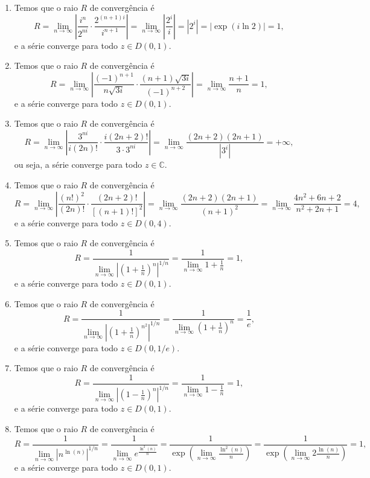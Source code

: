 \documentclass[12pt,a4paper]{article}
\begin{document}
\begin{enumerate}
\begin{enumerate}
			\item Temos que o raio $R$ de convergência é
			$$
			R = \lim\limits_{n\to\infty}\left| \frac{i^n}{2^{ni}}\cdot\frac{2^{(n+1)i}}{i^{n+1}} \right| = \lim\limits_{n\to\infty}\left| \frac{2^i}{i} \right| = |2^i| = |\exp(i\ln2)| = 1,
			$$
			e a série converge para todo $z\in D(0,1)$.
			
			\item Temos que o raio $R$ de convergência é
			$$
			R = \lim\limits_{n\to\infty} \left| \frac{(-1)^{n+1}}{n\sqrt{3i}}\cdot\frac{(n+1)\sqrt{3i}}{(-1)^{n+2}} \right| = \lim\limits_{n\to\infty}\frac{n+1}{n} = 1,
			$$
			e a série converge para todo $z\in D(0,1)$.
			
			\item Temos que o raio $R$ de convergência é
			$$
			R = \lim\limits_{n\to\infty}\left| \frac{3^{ni}}{i(2n)!}\cdot\frac{i(2n+2)!}{3\cdot 3^{ni}} \right| = \lim\limits_{n\to\infty} \frac{(2n+2)(2n+1)}{|3^i|} = +\infty, 
			$$
			ou seja, a série converge para todo $z\in\mathbb{C}$.
			
			\item Temos que o raio $R$ de convergência é 
			$$
			R = \lim\limits_{n\to\infty}\left| \frac{(n!)^2}{(2n)!}\cdot\frac{(2n+2)!}{[(n+1)!]^2} \right| = \lim\limits_{n\to\infty}\frac{(2n+2)(2n+1)}{(n+1)^2} = \lim\limits_{n\to\infty} \frac{4n^2+6n+2}{n^2+2n+1} = 4,
			$$
			e a série converge para todo $z\in D(0,4)$.
			
			\item Temos que o raio $R$ de convergência é
			$$
			R = \frac{1}{\lim\limits_{n\to\infty} \left| \left( 1+\frac{1}{n} \right)^n \right|^{1/n} } = \frac{1}{\lim\limits_{n\to\infty} 1 + \frac{1}{n}} = 1,
			$$
			e a série converge para todo $z\in D(0,1)$.
			
			\item Temos que o raio $R$ de convergência é
			$$
			R = \frac{1}{\lim\limits_{n\to\infty} \left| \left( 1+\frac{1}{n} \right)^{n^2} \right|^{1/n} } = \frac{1}{\lim\limits_{n\to\infty} \left(1 + \frac{1}{n}\right)^n} = \frac{1}{e},
			$$
			e a série converge para todo $z\in D(0,1/e)$.
			
			\item Temos que o raio $R$ de convergência é
			$$
			R = \frac{1}{\lim\limits_{n\to\infty} \left| \left( 1-\frac{1}{n} \right)^n \right|^{1/n} } = \frac{1}{\lim\limits_{n\to\infty} 1 - \frac{1}{n}} = 1,
			$$
			e a série converge para todo $z\in D(0,1)$.
			
			\item Temos que o raio $R$ de convergência é
			$$
			R = \frac{1}{\lim\limits_{n\to\infty}\left| n^{\ln(n)} \right|^{1/n}} = \frac{1}{\lim\limits_{n\to\infty} e^{\frac{\ln^2(n)}{n}}} = \frac{1}{\exp\left( \lim\limits_{n\to\infty} \frac{\ln^2(n)}{n} \right)} = \frac{1}{\exp\left(\lim\limits_{n\to\infty} 2\frac{\ln(n)}{n} \right)} = 1,
			$$
			e a série converge para todo $z\in D(0,1)$.
			

\end{enumerate}
\end{enumerate}
\end{document}
